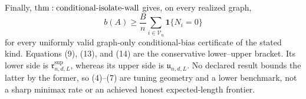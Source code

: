Finally, \({\rm thm:conditional\text{-}isolate\text{-}wall}\) gives, on every realized graph,
\[
 b(A)\geq\frac Bn\sum_{i\in\mathcal V_n}\mathbf1\{N_i=0\}
\tag{15}
\]
for every uniformly valid graph-only conditional-bias certificate of the stated kind.  Equations (9), (13), and (14) are the conservative lower--upper bracket.  Its lower side is \(\mathfrak r^{\mathrm{sup}}_{n,d,L}\), whereas its upper side is \(\mathfrak u_{n,d,L}\).  No declared result bounds the latter by the former, so (4)--(7) are tuning geometry and a lower benchmark, not a sharp minimax rate or an achieved honest expected-length frontier.